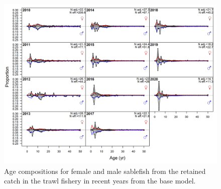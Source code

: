 \documentclass[11pt,
  english,
  a4paper,
]{article}
\begin{document}
\tagmcend\tagstructend


\begin{figure}
\centering
\includegraphics[width=1\textwidth,height=1\textheight]{figs/torc_fleet3_agecomps.png}
\caption{Age compositions for female and male sablefish from the retained catch in the trawl fishery in recent years from the base model. \label{fig:torc_fleet3_agecomps}}
\end{figure}

\tagmcend\tagstructend

\end{document}
